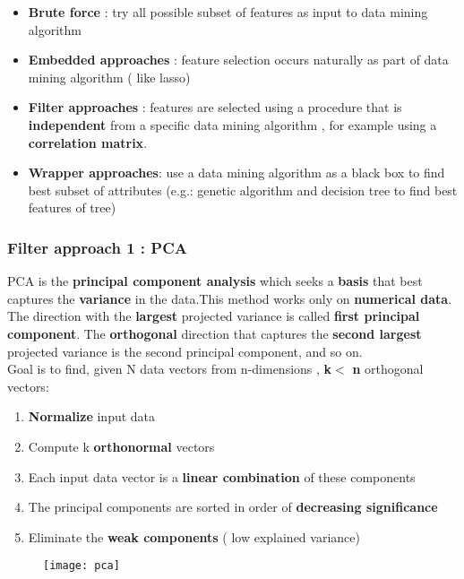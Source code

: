 \begin{itemize}

\item \textbf{Brute force} : try all possible subset of features as input to data mining algorithm

\item \textbf{Embedded approaches} : feature selection occurs naturally as part of data mining algorithm ( like lasso)

\item \textbf{Filter approaches} : features are selected using a procedure that is \textbf{independent} from a specific data mining algorithm , for example using a \textbf{correlation matrix}.

\item \textbf{Wrapper approaches}: use a data mining algorithm as a black box to find best subset of attributes (e.g.: genetic algorithm and decision tree to find best features of tree)
\end{itemize}


\subsubsection{Filter approach 1 : PCA}
PCA is the \textbf{principal component analysis} which seeks a \textbf{basis} that best captures the \textbf{variance} in the data.This method works only on \textbf{numerical data}. The direction with the \textbf{largest} projected variance is called \textbf{first principal component}. The \textbf{orthogonal} direction that captures the \textbf{second largest} projected variance is the second principal component, and so on.\\
Goal is to find, given N data vectors from n-dimensions , \textbf{k}$<$ \textbf{n} orthogonal vectors:
\begin{enumerate}
\item \textbf{Normalize} input data
\item Compute k \textbf{orthonormal} vectors
\item Each input data vector is a \textbf{linear combination} of these components
\item The principal components are sorted in order of \textbf{decreasing significance}
\item Eliminate the \textbf{weak components} ( low explained variance)
\end{enumerate}
\begin{figure}[H]
  \centering
  \texttt{[image: pca]}
\end{figure}

